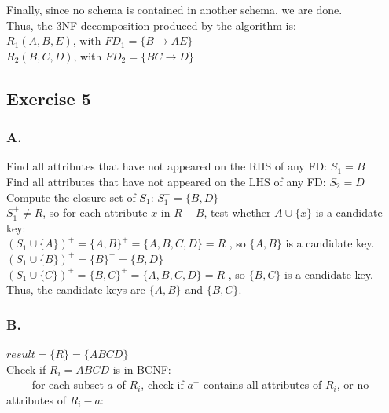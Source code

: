 \documentclass[a4paper]{article}
\begin{document}
Finally, since no schema is contained in another schema, we are done. \\

Thus, the 3NF decomposition produced by the algorithm is: \\

$ R_1(A, B, E) $, with $ FD_1 = \{B \rightarrow AE\} $ \\
$ R_2(B, C, D) $, with $ FD_2 = \{BC \rightarrow D \} $

\subsection*{Exercise 5}

\subsubsection*{A.}

Find all attributes that have not appeared on the RHS of any FD: $ S_1 = {B} $ \\
Find all attributes that have not appeared on the LHS of any FD: $ S_2 = {D} $ \\

Compute the closure set of $ S_1 $: $ S_1^+ = \{B, D\} $ \\

$ S_1^+ \neq R $, so for each attribute $ x $ in  $ R-B $, test whether $ A \cup \{x\} $ is a candidate key: \\

$(S_1 \cup \{ A \})^+ = \{ A, B\}^+ = \{A, B, C, D\} = R$ , so $ \{ A, B\} $ is a candidate key. \\
$(S_1 \cup \{ B \})^+ = \{ B \}^+ = \{B, D\}$ \\
$(S_1 \cup \{ C \})^+ = \{ B, C\}^+ = \{A, B, C, D\} = R$ , so $ \{ B, C\} $ is a candidate key. \\

Thus, the candidate keys are $ \{ A, B\} $ and $ \{B, C \} $.

\subsubsection*{B.}

$result = \{R\} = \{ABCD\}$ \\

Check if $R_i = ABCD$ is in BCNF: \\

~~~~ for each subset $a$ of $R_i$, check if $a^+$ contains all attributes of $ R_i $, or no attributes of $ R_i - a $: \\
		
\end{document}
